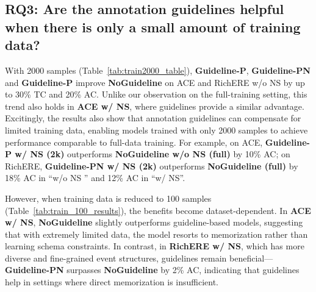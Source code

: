 \subsection{RQ3: Are the annotation guidelines helpful when there is only a small amount of training data?}
With 2000 samples (Table~\ref{tab:train2000_table}), \textbf{Guideline-P}, \textbf{Guideline-PN} and \textbf{Guideline-P} improve \textbf{NoGuideline} on ACE and RichERE w/o NS by up to 30\% TC and 20\% AC. Unlike our observation on the full-training setting, this trend also holds in \textbf{ACE w/ NS}, where guidelines provide a similar advantage. 
Excitingly, the results also show that annotation guidelines can compensate for limited training data, enabling models trained with only 2000 samples to achieve performance comparable to full-data training. For example, on ACE, \textbf{Guideline-P w/ NS (2k)} outperforms \textbf{NoGuideline w/o NS (full)} by 10\% AC; on RichERE, \textbf{Guideline-PN w/ NS (2k)} outperforms \textbf{NoGuideline (full)} by 18\% AC in ``w/o NS '' and 12\% AC in ``w/ NS''.



However, when training data is reduced to 100 samples (Table~\ref{tab:train_100_results}), the benefits become dataset-dependent. In \textbf{ACE w/ NS}, \textbf{NoGuideline} slightly outperforms guideline-based models, suggesting that with extremely limited data, the model resorts to memorization rather than learning schema constraints. In contrast, in \textbf{RichERE w/ NS}, which has more diverse and fine-grained event structures, guidelines remain beneficial—\textbf{Guideline-PN} surpasses \textbf{NoGuideline} by 2\% AC, indicating that guidelines help in settings where direct memorization is insufficient.


